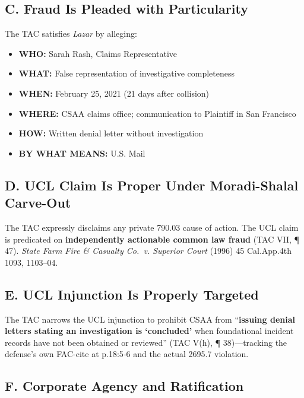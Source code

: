 \subsection{C. Fraud Is Pleaded with Particularity}\label{c.-fraud-is-pleaded-with-particularity}

The TAC satisfies \emph{Lazar} by alleging:

\begin{itemize}
\tightlist
\item
  \textbf{WHO:} Sarah Rash, Claims Representative
\item
  \textbf{WHAT:} False representation of investigative completeness
\item
  \textbf{WHEN:} February 25, 2021 (21 days after collision)
\item
  \textbf{WHERE:} CSAA claims office; communication to Plaintiff in San Francisco
\item
  \textbf{HOW:} Written denial letter without investigation
\item
  \textbf{BY WHAT MEANS:} U.S. Mail
\end{itemize}

\subsection{D. UCL Claim Is Proper Under Moradi-Shalal Carve-Out}\label{d.-ucl-claim-is-proper-under-moradi-shalal-carve-out}

The TAC expressly disclaims any private \textsection{} 790.03 cause of action. The UCL claim is predicated on \textbf{independently actionable common law fraud} (TAC \textsection{}VII, ¶ 47). \emph{State Farm Fire \& Casualty Co.~v. Superior Court} (1996) 45 Cal.App.4th 1093, 1103--04.

\subsection{E. UCL Injunction Is Properly Targeted}\label{e.-ucl-injunction-is-properly-targeted}

The TAC narrows the UCL injunction to prohibit CSAA from ``\textbf{issuing denial letters stating an investigation is `concluded'} when foundational incident records have not been obtained or reviewed'' (TAC \textsection{}V(h), ¶ 38)---tracking the defense's own FAC-cite at p.18:5-6 and the actual \textsection{} 2695.7 violation.

\subsection{F. Corporate Agency and Ratification}\label{f.-corporate-agency-and-ratification}


